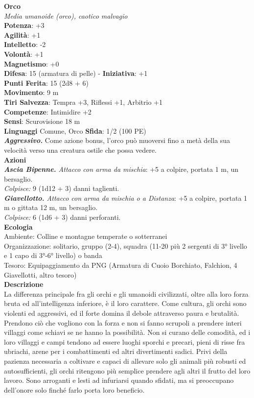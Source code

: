 \begin{multicols}{2}
\medskip\textbf{Orco}\\
\emph{Media umanoide (orco), caotico malvagio}\\
\textbf{Potenza}: +3\\
\textbf{Agilità}: +1\\
\textbf{Intelletto}: -2\\
\textbf{Volontà}: +1\\
\textbf{Magnetismo}: +0\\
\textbf{Difesa}: 15 (armatura di pelle) - \textbf{Iniziativa}: +1\\
\textbf{Punti Ferita}: 15 (2d8 + 6)\\
\textbf{Movimento}: 9 m\\
\textbf{Tiri Salvezza}: Tempra +3, Riflessi +1, Arbitrio +1\\
\textbf{Competenze}: Intimidire +2\\
\textbf{Sensi}: Scurovisione 18 m\\
\textbf{Linguaggi} Comune, Orco \textbf{Sfida}: 1/2 (100 PE)\smallskip\\
\emph{\textbf{Aggressivo.}} Come azione bonus, l'orco può muoversi fino a metà della sua velocità verso una creatura ostile che possa vedere. \\
\smallskip\textbf{Azioni}\\
\emph{\textbf{Ascia Bipenne.} Attacco con arma da mischia}: +5 a colpire, portata 1 m, un bersaglio.\\
\emph{Colpisce:} 9 (1d12 + 3) danni taglienti.\\
\emph{\textbf{Giavellotto.} Attacco con arma da mischia o a Distanza}: +5 a colpire, portata 1 m o gittata 12 m, un bersaglio. \\
\emph{Colpisce:} 6 (1d6 + 3) danni perforanti.\\
\textbf{Ecologia}\\
Ambiente: Colline e montagne temperate o sotterranei\\
Organizzazione: solitario, gruppo (2-4), squadra (11-20 più 2 sergenti di 3° livello e 1 capo di 3°-6° livello) o banda \\
Tesoro: Equipaggiamento da PNG (Armatura di Cuoio Borchiato, Falchion, 4 Giavellotti, altro tesoro)\\
\textbf{Descrizione}\\
La differenza principale fra gli orchi e gli umanoidi civilizzati, oltre alla loro forza bruta ed all'intelligenza inferiore, è il loro carattere. Come cultura, gli orchi sono violenti ed aggressivi, ed il forte domina il debole attraverso paura e brutalità. Prendono ciò che vogliono con la forza e non si fanno scrupoli a prendere interi villaggi come schiavi se ne hanno la possibilità. Non si curano delle comodità, ed i loro villaggi e campi tendono ad essere luoghi sporchi e precari, pieni di risse fra ubriachi, arene per i combattimenti ed altri divertimenti sadici. Privi della pazienza necessaria a coltivare e capaci di allevare solo gli animali più robusti ed autosufficienti, gli orchi ritengono più semplice prendere agli altri il frutto del loro lavoro. Sono arroganti e lesti ad infuriarsi quando sfidati, ma si preoccupano dell’onore solo finché farlo porta loro beneficio.\\


\end{multicols}
